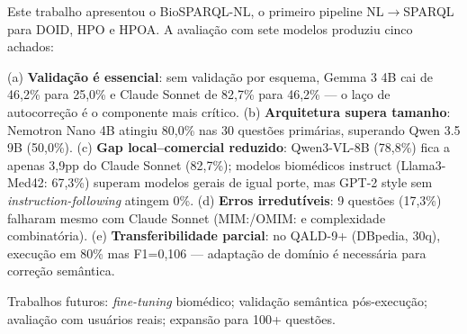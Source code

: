 \documentclass[12pt]{article}
\begin{document}
Este trabalho apresentou o BioSPARQL-NL, o primeiro pipeline NL$\rightarrow$SPARQL para DOID, HPO e HPOA. A avalia\c{c}\~{a}o com sete modelos produziu cinco achados:

(a) \textbf{Valida\c{c}\~{a}o \'{e} essencial}: sem valida\c{c}\~{a}o por esquema, Gemma 3 4B cai de 46,2\% para 25,0\% e Claude Sonnet de 82,7\% para 46,2\% --- o la\c{c}o de autocorre\c{c}\~{a}o \'{e} o componente mais cr\'{i}tico.
(b) \textbf{Arquitetura supera tamanho}: Nemotron Nano 4B atingiu 80,0\% nas 30 quest\~{o}es prim\'{a}rias, superando Qwen 3.5 9B (50,0\%).
(c) \textbf{Gap local--comercial reduzido}: Qwen3-VL-8B (78,8\%) fica a apenas 3,9pp do Claude Sonnet (82,7\%); modelos biom\'{e}dicos instruct (Llama3-Med42: 67,3\%) superam modelos gerais de igual porte, mas GPT-2 style sem \textit{instruction-following} atingem 0\%.
(d) \textbf{Erros irredut\'{i}veis}: 9 quest\~{o}es (17,3\%) falharam mesmo com Claude Sonnet (MIM:/OMIM: e complexidade combinat\'{o}ria).
(e) \textbf{Transferibilidade parcial}: no QALD-9+ \cite{qaldnineplus} (DBpedia, 30q), execu\c{c}\~{a}o em 80\% mas F1=0,106 --- adapta\c{c}\~{a}o de dom\'{i}nio \'{e} necess\'{a}ria para corre\c{c}\~{a}o sem\^{a}ntica.

Trabalhos futuros: \textit{fine-tuning} biom\'{e}dico; valida\c{c}\~{a}o sem\^{a}ntica p\'{o}s-execu\c{c}\~{a}o; avalia\c{c}\~{a}o com usu\'{a}rios reais; expans\~{a}o para 100+ quest\~{o}es.




\end{document}
